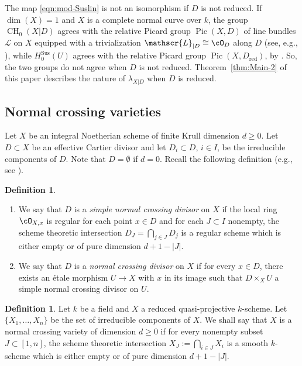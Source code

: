 \documentclass[JEP,XML,SOM,Unicode,published]{cedram}
\let\mathcal\mathscr
\newcommand{\sus}{\mathrm{Sus}}
\theoremstyle{definition}
\newtheorem{defn}[thm]{Definition}
\newcommand{\thmref}{Theorem~\ref}
\DeclareMathOperator{\CH}{CH}
\DeclareMathOperator{\Pic}{Pic}
\newcommand{\red}{\mathrm{red}}
\begin{document}
The map \eqref{eqn:mod-Suslin} is not an isomorphism if $D$ is not reduced. If $\dim(X)=1$ and $X$ is a complete normal curve over $k$, the group $\CH_0(X|D)$ agrees with the relative Picard group $\Pic(X,D)$ of line bundles $\mathcal{L}$ on $X$ equipped with a trivialization $\mathcal{L}_{|D} \cong \cO_D$ along $D$ (see, e.g., \cite[\S 4]{BS}), while $H_0^{\sus}(U)$ agrees with the relative Picard group $\Pic(X, D_{\red})$, by \cite[Th.\,7.16]{MVW}. So, the two groups do not agree when $D$ is not reduced.
\thmref{thm:Main-2} of this paper describes the nature of
$\lambda_{X|D}$ when $D$ is reduced.

\subsection{Normal crossing varieties} Let $X$ be an integral
Noetherian scheme of finite Krull dimension $d\!\ge\!0$.
Let $D\!\subset\!X$ be an effective Cartier divisor and
let $D_i\!\subset\!D$, $i\!\in\!I$, be the irreducible components of $D$.
Note that $D = \emptyset$ if $d = 0$. Recall the following definition
(e.g., see \cite[2.4]{deJong}).

\skpt
\begin{defn}\label{defn:ncs}
\begin{enumerate}
\item
We say that $D$ is a \emph{simple normal crossing divisor} on $X$
if the local ring $\cO_{X,x}$ is regular for each point $x\in D$ and for
each $J \subset I$ nonempty, the scheme theoretic intersection
$D_J = \bigcap_{j\in J} D_j$ is a regular scheme which is either empty or
of pure dimension $d+1-|J|$.

\item
We say that $D$ is a \emph{normal crossing divisor} on $X$ if for every
$x \in D$, there exists an étale morphism $U \to X$ with $x$ in its image
such that $D \times_X U$ a simple normal crossing divisor on $U$.
\end{enumerate}
\end{defn}

\begin{defn}\label{defn:ncg}
Let $k$ be a field and $X$ a reduced quasi-projective $k$-scheme.
Let $\{X_1, \ldots , X_n\}$ be the set of irreducible components of $X$. We
shall say that $X$ is a normal crossing variety of dimension $d \ge 0$
if for every nonempty subset $J \subset [1, n]$, the scheme theoretic
intersection $X_J := \bigcap_{i \in J} X_i$ is a smooth $k$-scheme
which is either empty or of pure dimension $d + 1 - |J|$.
\end{defn}
\end{document}
